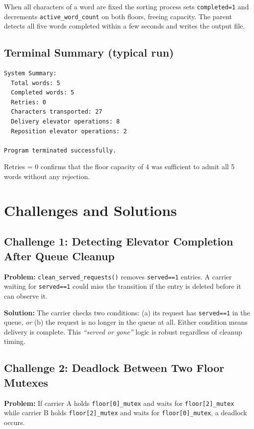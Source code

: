 \documentclass[12pt,a4paper]{article}
\newcommand{\code}[1]{\texttt{\small #1}}
\begin{document}
When all characters of a word are fixed the sorting process sets
\code{completed=1} and decrements \code{active\_word\_count} on both floors,
freeing capacity. The parent detects all five words completed within a few seconds
and writes the output file.

\subsection{Terminal Summary (typical run)}

\begin{lstlisting}[language={},numbers=none]
System Summary:
  Total words: 5
  Completed words: 5
  Retries: 0
  Characters transported: 27
  Delivery elevator operations: 8
  Reposition elevator operations: 2

Program terminated successfully.
\end{lstlisting}

Retries = 0 confirms that the floor capacity of 4 was sufficient to admit all
5 words without any rejection.

\section{Challenges and Solutions}

\subsection{Challenge 1: Detecting Elevator Completion After Queue Cleanup}

\textbf{Problem:} \code{clean\_served\_requests()} removes \code{served==1}
entries. A carrier waiting for \code{served==1} could miss the transition if the
entry is deleted before it can observe it.

\textbf{Solution:} The carrier checks two conditions: (a) its request has
\code{served==1} in the queue, \emph{or} (b) the request is no longer in the queue
at all. Either condition means delivery is complete. This \emph{``served or gone''}
logic is robust regardless of cleanup timing.

\subsection{Challenge 2: Deadlock Between Two Floor Mutexes}

\textbf{Problem:} If carrier A holds \code{floor[0]\_mutex} and waits for
\code{floor[2]\_mutex} while carrier B holds \code{floor[2]\_mutex} and waits for
\code{floor[0]\_mutex}, a deadlock occurs.
\end{document}
